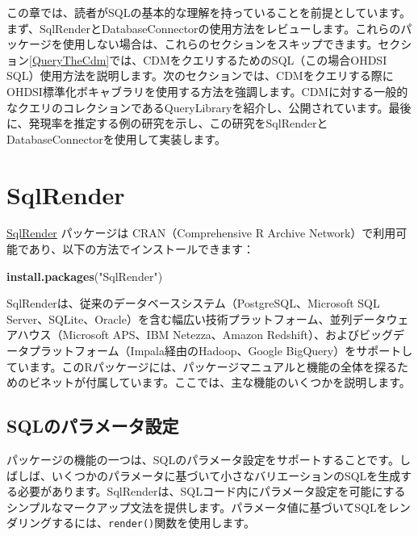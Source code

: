 \documentclass[
  11pt]{book}
\newenvironment{Shaded}{\begin{snugshade}}{\end{snugshade}}
\newcommand{\FunctionTok}[1]{\textcolor[rgb]{0.13,0.29,0.53}{\textbf{#1}}}
\newcommand{\NormalTok}[1]{#1}
\newcommand{\StringTok}[1]{\textcolor[rgb]{0.31,0.60,0.02}{#1}}
\theoremstyle{definition}
\theoremstyle{definition}
\theoremstyle{definition}
\theoremstyle{definition}
\theoremstyle{remark}
\begin{document}
この章では、読者がSQLの基本的な理解を持っていることを前提としています。まず、SqlRenderとDatabaseConnectorの使用方法をレビューします。これらのパッケージを使用しない場合は、これらのセクションをスキップできます。セクション\ref{QueryTheCdm}では、CDMをクエリするためのSQL（この場合OHDSI SQL）使用方法を説明します。次のセクションでは、CDMをクエリする際にOHDSI標準化ボキャブラリを使用する方法を強調します。CDMに対する一般的なクエリのコレクションであるQueryLibraryを紹介し、公開されています。最後に、発現率を推定する例の研究を示し、この研究をSqlRenderとDatabaseConnectorを使用して実装します。  

\section{SqlRender}\label{SqlRender}

\href{https://ohdsi.github.io/SqlRender/}{SqlRender} パッケージは CRAN（Comprehensive R Archive Network）で利用可能であり、以下の方法でインストールできます：

\begin{Shaded}
\begin{Highlighting}[]
\FunctionTok{install.packages}\NormalTok{(}\StringTok{"SqlRender"}\NormalTok{)}
\end{Highlighting}
\end{Shaded}

SqlRenderは、従来のデータベースシステム（PostgreSQL、Microsoft SQL Server、SQLite、Oracle）を含む幅広い技術プラットフォーム、並列データウェアハウス（Microsoft APS、IBM Netezza、Amazon Redshift）、およびビッグデータプラットフォーム（Impala経由のHadoop、Google BigQuery）をサポートしています。このRパッケージには、パッケージマニュアルと機能の全体を探るためのビネットが付属しています。ここでは、主な機能のいくつかを説明します。

\subsection{SQLのパラメータ設定}\label{sqlux306eux30d1ux30e9ux30e1ux30fcux30bfux8a2dux5b9a}

パッケージの機能の一つは、SQLのパラメータ設定をサポートすることです。しばしば、いくつかのパラメータに基づいて小さなバリエーションのSQLを生成する必要があります。SqlRenderは、SQLコード内にパラメータ設定を可能にするシンプルなマークアップ文法を提供します。パラメータ値に基づいてSQLをレンダリングするには、\texttt{render()}関数を使用します。 
\end{document}
